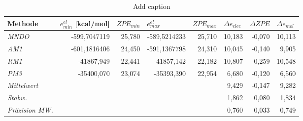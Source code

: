 \begin{table}[H]
  \centering
  \caption{Add caption}
  \begin{tabular}{lrrrrrrr}
    \toprule
    \textbf{Methode} & \multicolumn{1}{l}{\boldmath{}\textbf{$e^{el}_{min}$ [kcal/mol]}\unboldmath{}} & \multicolumn{1}{l}{\boldmath{}\textbf{$ZPE_{min}$}\unboldmath{}} & \multicolumn{1}{l}{\boldmath{}\textbf{$e^{el}_{max}$}\unboldmath{}} & \multicolumn{1}{l}{\boldmath{}\textbf{$ZPE_{max}$}\unboldmath{}} & \multicolumn{1}{l}{\boldmath{}\textbf{$\Delta e_{elec}$}\unboldmath{}} & \multicolumn{1}{l}{\boldmath{}\textbf{$\Delta ZPE$}\unboldmath{}} & \multicolumn{1}{l}{\boldmath{}\textbf{$\Delta e_{mol}$}\unboldmath{}} \\
    \midrule
    \textit{MNDO} & -599,7047119 & 25,780 & -589,5214233 & 25,710 & 10,183 & -0,070 & 10,113 \\
    \textit{AM1} & -601,1816406 & 24,450 & -591,1367798 & 24,310 & 10,045 & -0,140 & 9,905 \\
    \midrule
    \textit{RM1} & -41867,949 & 22,441 & -41857,142 & 22,182 & 10,807 & -0,259 & 10,548 \\
    \textit{PM3} & -35400,070 & 23,074 & -35393,390 & 22,954 & 6,680 & -0,120 & 6,560 \\
    \midrule
    \midrule
    \textit{Mittelwert} &       &       &       &       & 9,429 & -0,147 & 9,282 \\
    \textit{Stabw.} &       &       &       &       & 1,862 & 0,080 & 1,834 \\
    \textit{Präzision MW.} &       &       &       &       & 0,760 & 0,033 & 0,749 \\
    \bottomrule
    \end{tabular}%
  \label{tab:addlabel}%
\end{table}%
